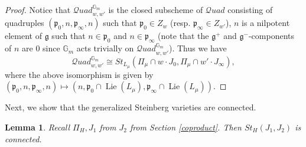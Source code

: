 \documentclass{amsart}
\newcommand{\cQuad}{\mathcal{Q}uad}
\newcommand{\gm}{\mathbb{G}_{m}}
\theoremstyle{plain}
\newtheorem{lemma}[theorem]{Lemma}
\theoremstyle{definition}
\theoremstyle{remark}
\DeclareMathOperator{\lie}{Lie}
\begin{document}
\begin{proof}
Notice that $\cQuad_{w,w'}^{\gm}$ is the closed subscheme of $\cQuad$ consisting of quadruples $(\mathfrak{p}_{0},n,\mathfrak{p}_{\infty},n)$ such that
$\mathfrak{p}_{0}\in Z_{w}$ (resp. $\mathfrak{p}_{\infty}\in Z_{w'}$),
$n$ is a nilpotent element of $\mathfrak{g}$ such that $n\in\mathfrak{p}_{0}$ and $n\in\mathfrak{p}_{\infty}$
(note that the $\mathfrak{g}^{+}$ and $\mathfrak{g}^{-}$-components of $n$ are $0$ since $\gm$ acts trivially on $\cQuad_{w,w'}^{\gm}$). Thus we have
\begin{equation}\label{isomorphism to steinberg variety}
\cQuad_{w,w'}^{\gm}\cong St_{L_{\mu}}(\Pi_{\mu}\cap w\cdot J_{0},\Pi_{\mu}\cap w'\cdot J_{\infty}),
\end{equation}
where the above isomorphism is given by $(\mathfrak{p}_{0},n,\mathfrak{p}_{\infty},n)\mapsto(n,\mathfrak{p}_{0}\cap \lie(L_{\mu}),\mathfrak{p}_{\infty}\cap \lie(L_{\mu}))$.
\end{proof}
Next, we show that the generalized Steinberg varieties are connected.
\begin{lemma}\label{connectedness of steinberg varieties}
Recall $\Pi_{H}, J_{1}$ from $J_{2}$
from Section \ref{coproduct}. Then $St_{H}(J_{1},J_{2})$ is connected.
\end{lemma}
\end{document}
